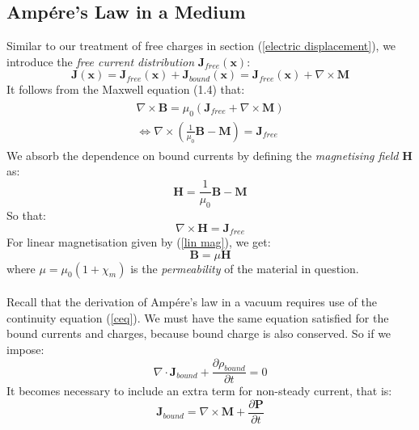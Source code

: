 \documentclass[a4paper]{article}
\numberwithin{equation}{section}
\begin{document}
\subsection{Amp\'ere's Law in a Medium}
Similar to our treatment of free charges in section (\ref{electric displacement}), we introduce the \textit{free current distribution} $\mathbf{J}_{free}(\mathbf{x})$:
\begin{equation}
\mathbf{J}(\mathbf{x}) = \mathbf{J}_{free}(\mathbf{x}) + \mathbf{J}_{bound}(\mathbf{x}) = \mathbf{J}_{free}(\mathbf{x}) + \nabla \times \mathbf{M}
\end{equation}
It follows from the Maxwell equation (1.4) that:
\begin{gather}
\begin{split}
\nabla \times \mathbf{B} = \mu_0(\mathbf{J}_{free} + \nabla \times \mathbf{M}) \\
\iff \nabla \times (\frac{1}{\mu_0} \mathbf{B} - \mathbf{M})= \mathbf{J}_{free}
\end{split}
\end{gather}
We absorb the dependence on bound currents by defining the \textit{magnetising field} $\mathbf{H}$ as:
\begin{equation}
\mathbf{H} = \frac{1}{\mu_0} \mathbf{B} - \mathbf{M}
\end{equation}
So that:
\begin{equation}
\nabla \times \mathbf{H} = \mathbf{J}_{free}
\end{equation}
For linear magnetisation given by (\ref{lin mag}), we get:
\begin{equation}
\mathbf{B}= \mu \mathbf{H} 
\end{equation}
where $\mu= \mu_0(1+\chi_m)$ is the \textit{permeability} of the material in question.\\
\\
Recall that the derivation of Amp\'ere's law in a vacuum requires use of the continuity equation (\ref{ceq}). We must have the same equation satisfied for the bound currents and charges, because bound charge is also conserved. So if we impose:
\begin{equation}
\nabla \cdot \mathbf{J}_{bound}+\frac{\partial \rho_{bound}}{\partial t} = 0
\end{equation}
It becomes necessary to include an extra term for non-steady current, that is:
\begin{equation}
\mathbf{J}_{bound} = \nabla \times \mathbf{M} + \frac{\partial \mathbf{P}}{\partial t}
\end{equation}
\end{document}
